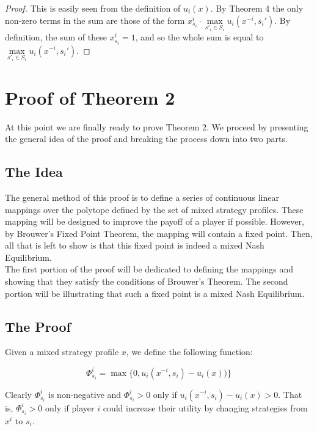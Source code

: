 \documentclass[12pt]{article}
\begin{document}
\begin{proof}
This is easily seen from the definition of $u_i(x)$. By Theorem 4 the only non-zero terms in the sum are those of the form $x^i_{s_i} \cdot \max\limits_{s'_i \in S_i}  u_i(x^{-i}, s_i')$. By definition, the sum of these $x^i_{s_i} = 1$, and so the whole sum is equal to $\max\limits_{s'_i \in S_i}  u_i(x^{-i}, s_i')$.
\end{proof}

\section{Proof of Theorem 2}

At this point we are finally ready to prove Theorem 2. We proceed by presenting the general idea of the proof and breaking the process down into two parts.\\

\subsection{The Idea}

The general method of this proof is to define a series of continuous linear mappings over the polytope defined by the set of mixed strategy profiles. These mapping will be designed to improve the payoff of a player if possible. However, by Brouwer's Fixed Point Theorem, the mapping will contain a fixed point. Then, all that is left to show is that this fixed point is indeed a mixed Nash Equilibrium.\\



The first portion of the proof will be dedicated to defining the mappings and showing that they satisfy the conditions of Brouwer's Theorem. The second portion will be illustrating that such a fixed point is a mixed Nash Equilibrium.

\subsection{The Proof\cite{1}} 

Given a mixed strategy profile $x$, we define the following function:

\begin{equation*}
\Phi^i_{s_i} = \max\{ 0,u_i(x^{-i},s_i) - u_i(x))\}
\end{equation*}

Clearly $\Phi^i_{s_i}$ is non-negative and $\Phi^i_{s_i} > 0$ only if $u_i(x^{-i},s_i) - u_i(x) > 0$. That is, $\Phi^i_{s_i} > 0$ only if player $i$ could increase their utility by changing strategies from $x^i$ to $s_i$.\\
\end{document}
